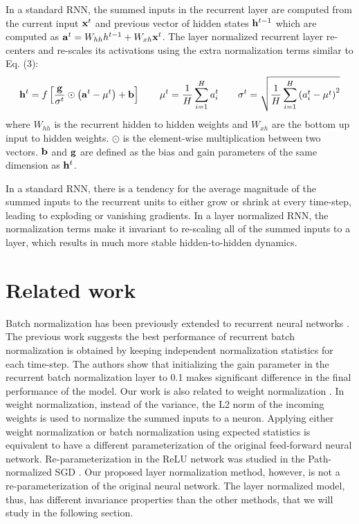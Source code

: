 \documentclass{article}
\newcommand{\actFunc}{{f}}
\newcommand{\Gain}{{\bold g}}
\newcommand{\Bias}{{\bold b}}
\newcommand{\Weights}{{W}}
\newcommand{\hidden}{{h}}
\newcommand{\Hidden}{{\bold h}}
\newcommand{\Act}{{\bold a}}
\newcommand{\data}{{\bold x}}
\begin{document}
In a standard RNN, the summed inputs in the recurrent layer are computed from the current input $\data^t$ and previous vector of hidden states $\Hidden^{t-1}$ which are computed as $\Act^t = \Weights_{hh} \hidden^{t-1} + \Weights_{xh} \data^t$. The layer normalized recurrent layer re-centers and re-scales its activations using the extra normalization terms similar to Eq. (3):
\begin{equation}
\Hidden^t = \actFunc\left[{\Gain\over\sigma^t}\odot\left(\Act^t - \mu^t\right) + \Bias \right]
\qquad
\mu^t = \frac{1}{H}\sum_{i = 1}^H  {a_i^t}
\qquad
\sigma^t = \sqrt{\frac{1}{H}\sum_{i = 1}^H  \left( {a_i^t} - \mu^t \right)^2}
\end{equation}
where $\Weights_{hh}$ is the recurrent hidden to hidden weights and $\Weights_{xh}$ are the bottom up input to hidden weights. $\odot$ is the element-wise multiplication between two vectors. $\Bias$ and $\Gain$ are defined as the bias and gain parameters of the same dimension as $\Hidden^t$.

In a standard RNN, there is a tendency for the average magnitude of the summed inputs to the recurrent units to either grow or shrink at every time-step, leading to exploding or vanishing gradients. In a layer normalized RNN,  the normalization terms make it invariant to re-scaling all of the summed inputs to a layer, which results in much more stable hidden-to-hidden dynamics. 

\section{Related work}
Batch normalization has been previously extended to recurrent neural networks \citep{laurent2015batch, amodei2015deep, cooijmans2016recurrent}. The previous work \citep{cooijmans2016recurrent} suggests the best performance of recurrent batch normalization is obtained by keeping independent normalization statistics for each time-step. The authors show that initializing the gain parameter in the recurrent batch normalization layer to 0.1 makes significant difference in the final performance of the model. Our work is also related to weight normalization \citep{salimans2016weight}.  In weight normalization, instead of the variance, the L2 norm of the incoming weights is used to normalize the summed inputs to a neuron. Applying either weight normalization or batch normalization using expected statistics is equivalent to have a different parameterization of the original feed-forward neural network. Re-parameterization in the ReLU network was studied in the Path-normalized SGD \citep{neyshabur2015path}. Our proposed layer normalization method, however, is not a re-parameterization of the original neural network. The layer normalized model, thus, has different invariance properties than the other methods, that we will study in the following section.
\end{document}
